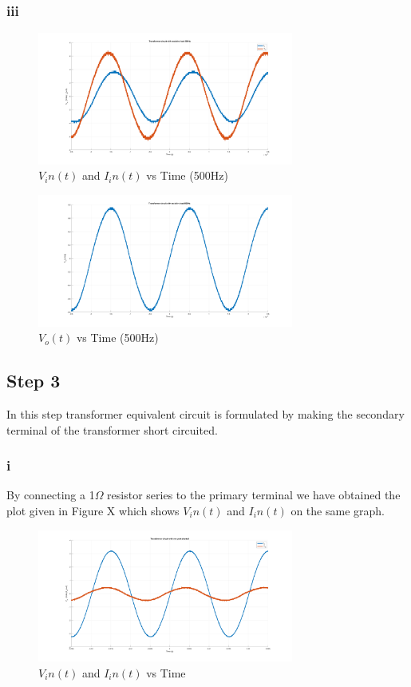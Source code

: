 \documentclass[letterpaper,12pt]{article}
\begin{document}
\subsubsection{iii}
\begin{figure}[H]
    \centering
    \includegraphics[width = 0.75\textwidth]{2_3_1.png}
    \caption{\(V_in(t) \) and \(I_in(t)\) vs Time (500Hz)}
\end{figure} 

\begin{figure}[H]
    \centering
    \includegraphics[width = 0.75\textwidth]{2_3_2.png}
    \caption{\(V_o(t) \) vs Time (500Hz)}
\end{figure} 
%
\subsection{Step 3}
In this step transformer equivalent circuit is formulated by making the secondary terminal of the transformer short circuited.
\subsubsection{i}
By connecting a 1\(\Omega\) resistor series to the primary terminal we have obtained the plot given in Figure X which shows \(V_in(t) \) and \(I_in(t)\) on the same graph.  
\begin{figure}[H]
    \centering
    \includegraphics[width = 0.75\textwidth]{3_1.png}
    \caption{\(V_in(t) \) and \(I_in(t)\) vs Time }
\end{figure} 
\end{document}
